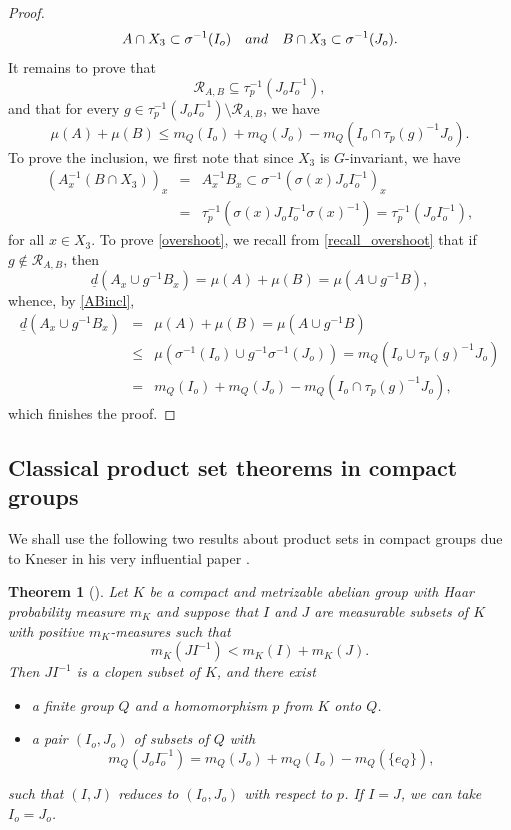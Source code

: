 \documentclass[11pt]{article}
\numberwithin{equation}{section}
\let\mathcal\mathscr
\newcommand{\cR}{\mathcal{R}}
\newcommand{\qand}{\quad\textup{and}\quad}
\theoremstyle{plain}
\newtheorem{theorem}{Theorem}[section]
\theoremstyle{definition}
\begin{document}
\begin{proof}
\begin{equation}
\label{ABincl}
A \cap X_3 \subset \sigma^{-1}(I_o) \qand B \cap X_3 \subset \sigma^{-1}(J_o).
\end{equation}
It remains to prove that
\[
\cR_{A,B} \subseteq \tau_p^{-1}(J_o I_o^{-1}),
\]
and that for every $g \in \tau_p^{-1}(J_o I_o^{-1}) \setminus \cR_{A,B}$, we have
\begin{equation}
\label{overshoot}
\mu(A) + \mu(B) \leq m_Q(I_o) + m_Q(J_o) - m_Q(I_o \cap \tau_p(g)^{-1}J_o).
\end{equation}
To prove the inclusion, we first note that since $X_3$ is $G$-invariant, we have
\begin{eqnarray*}
(A_x^{-1}(B \cap X_3))_x
&=&
A_x^{-1} B_x \subset \sigma^{-1}(\sigma(x)J_o I_o^{-1})_x \\
&=& \tau_p^{-1}(\sigma(x)J_o I_o^{-1}\sigma(x)^{-1}) = \tau_p^{-1}(J_o I_o^{-1}),
\end{eqnarray*}
for all $x \in X_3$. To prove \eqref{overshoot}, we recall from \eqref{recall_overshoot} that if $g \notin \cR_{A,B}$, then
\[
\underline{d}(A_x \cup g^{-1}B_x)
= \mu(A) + \mu(B) = \mu(A \cup g^{-1}B),
\]
whence, by \eqref{ABincl},
\begin{eqnarray*}
\underline{d}(A_x \cup g^{-1}B_x)
&=& \mu(A) + \mu(B) = \mu(A \cup g^{-1}B) \\
&\leq &
\mu(\sigma^{-1}(I_o) \cup g^{-1} \sigma^{-1}(J_o))
=
m_Q(I_o \cup \tau_p(g)^{-1}J_o) \\
&=&
m_Q(I_o) + m_Q(J_o) - m_Q(I_o \cap \tau_p(g)^{-1}J_o),
\end{eqnarray*}
which finishes the proof.
\end{proof}

\subsection{Classical product set theorems in compact groups}

We shall use the following two results about product sets in compact groups due to Kneser in his very influential paper \cite{Kneser}.

\begin{theorem}[{\cite[Satz\,1]{Kneser}}]
\label{thm_Kneser1}
Let $K$ be a compact and metrizable abelian group with Haar probability measure $m_K$ and suppose that $I$ and $J$ are measurable subsets of $K$
with positive $m_K$-measures such that
\[
m_K(JI^{-1}) < m_K(I) + m_K(J).
\]
Then $JI^{-1}$ is a clopen subset of $K$, and there exist

\begin{itemize}
\item a finite group $Q$ and a homomorphism $p$ from $K$ onto $Q$.
\item a pair $(I_o,J_o)$ of subsets of $Q$ with
\[
m_Q(J_o I_o^{-1}) = m_Q(J_o) + m_Q(I_o) - m_Q(\{e_Q\}),
\]
\end{itemize}
such that $(I,J)$ reduces to $(I_o,J_o)$ with respect to $p$. If $I = J$, we can take $I_o = J_o$.
\end{theorem}
\end{document}
